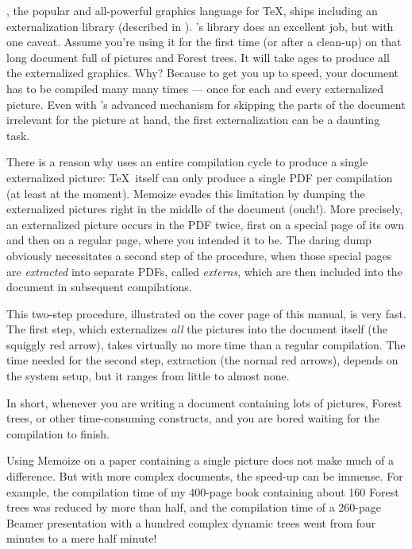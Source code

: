 \documentclass[a4paper,11pt]{article}
\begin{document}
\begin{tcolorbox}[
    title={\introboxtitle{Why} yet another externalization package?},
  ]
  \TikZ, the popular and all-powerful graphics language for \TeX, ships
  including an externalization library (described in ).  \TikZ's
  library does an excellent job, but with one caveat.  Assume you're using it
  for the first time (or after a clean-up) on that long document full of \TikZ
  pictures and Forest trees.  It will take ages to produce all the externalized
  graphics.  Why?  Because to get you up to speed, your document has to be
  compiled many many times --- once for each and every externalized picture.
  Even with \TikZ's advanced mechanism for skipping the parts of the document
  irrelevant for the picture at hand, the first externalization can be a
  daunting task.
\end{tcolorbox}

\begin{tcolorbox}[
    title={\introboxtitle{How} does Memoize save your time?},
  ]
  There is a reason why \TikZ uses an entire compilation cycle to produce a
  single externalized picture: \TeX\ itself can only produce a single PDF per
  compilation (at least at the moment).  Memoize evades this limitation by
  dumping the externalized pictures right in the middle of the document
  (ouch!).  More precisely, an externalized picture occurs in the PDF twice,
  first on a special page of its own and then on a regular page, where you
  intended it to be.  The daring dump obviously necessitates a second step of
  the procedure, when those special pages are \emph{extracted} into separate
  PDFs, called \emph{externs}, which are then included into the document in
  subsequent compilations.

  This two-step procedure, illustrated on the cover page of this manual, is
  very fast.  The first step, which externalizes \emph{all} the pictures into
  the document itself (the squiggly red arrow), takes virtually no more time
  than a regular compilation.  The time needed for the second step, extraction
  (the normal red arrows), depends on the system setup, but it ranges from
  little to almost none.
\end{tcolorbox}

\begin{tcolorbox}[
    title={\introboxtitle{When} should I use Memoize?},
  ]
  In short, whenever you are writing a document containing lots of \TikZ
  pictures, Forest trees, or other time-consuming constructs, and you are bored
  waiting for the compilation to finish.

  Using Memoize on a paper containing a single picture does not make much of a
  difference.  But with more complex documents, the speed-up can be immense.
  For example, the compilation time of my 400-page book containing about 160
  Forest trees was reduced by more than half, and the compilation time of a
  260-page Beamer presentation with a hundred complex dynamic trees went from
  four minutes to a mere half minute!
\end{tcolorbox}
\end{document}
